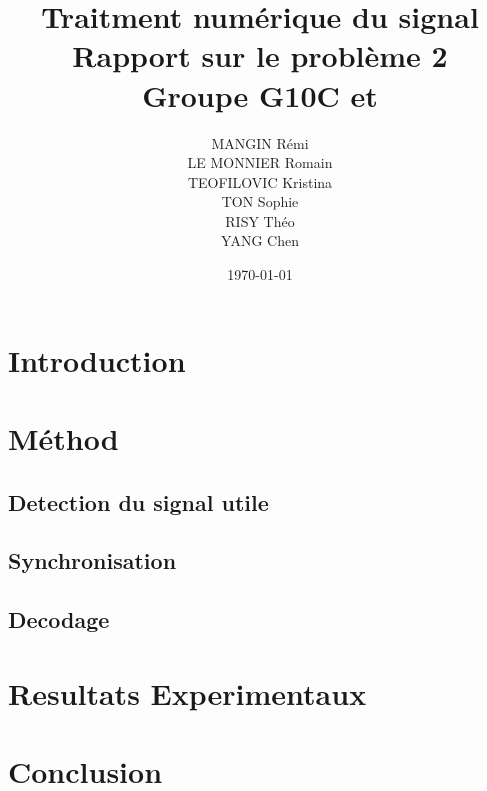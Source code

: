\documentclass{article}
\title{Traitment numérique du signal \\ \vspace{5mm} Rapport sur le problème 2 \\ \vspace{3mm} Groupe G10C et }
\author{MANGIN Rémi \\
LE MONNIER Romain \\
TEOFILOVIC Kristina \\
TON Sophie \\
RISY Théo \\
YANG Chen}
\date{\today}
\begin{document}
\maketitle

\newpage
\tableofcontents
\newpage

\newpage
\section{Introduction}

\newpage
\section{Méthod}

\subsection{Detection du signal utile}

\subsection{Synchronisation}

\subsection{Decodage}

\newpage
\section{Resultats Experimentaux}

\newpage
\section{Conclusion}

\end{document}
